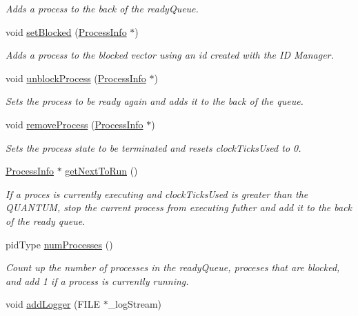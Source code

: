 \begin{DoxyCompactItemize}
\begin{DoxyCompactList}\small\item\em \-Adds a process to the back of the ready\-Queue. \end{DoxyCompactList}\item 
void \hyperlink{classcRoundRobin_a13609de0f36c81a780072f9c0730f963}{set\-Blocked} (\hyperlink{structProcessInfo}{\-Process\-Info} $\ast$)
\begin{DoxyCompactList}\small\item\em \-Adds a process to the blocked vector using an id created with the \-I\-D \-Manager. \end{DoxyCompactList}\item 
void \hyperlink{classcRoundRobin_a278d541c78f034020f6921b22a7d37af}{unblock\-Process} (\hyperlink{structProcessInfo}{\-Process\-Info} $\ast$)
\begin{DoxyCompactList}\small\item\em \-Sets the process to be ready again and adds it to the back of the queue. \end{DoxyCompactList}\item 
void \hyperlink{classcRoundRobin_a1bc7bfc4c36bdbe3f3938810817d885e}{remove\-Process} (\hyperlink{structProcessInfo}{\-Process\-Info} $\ast$)
\begin{DoxyCompactList}\small\item\em \-Sets the process state to be terminated and resets clock\-Ticks\-Used to 0. \end{DoxyCompactList}\item 
\hyperlink{structProcessInfo}{\-Process\-Info} $\ast$ \hyperlink{classcRoundRobin_a1979ff71bb2320bdb00eae5feb2b2688}{get\-Next\-To\-Run} ()
\begin{DoxyCompactList}\small\item\em \-If a proces is currently executing and clock\-Ticks\-Used is greater than the \-Q\-U\-A\-N\-T\-U\-M, stop the current process from executing futher and add it to the back of the ready queue. \end{DoxyCompactList}\item 
\hypertarget{classcRoundRobin_afa0cdfcfc0b8222d39ad5e9c23db1f25}{pid\-Type \hyperlink{classcRoundRobin_afa0cdfcfc0b8222d39ad5e9c23db1f25}{num\-Processes} ()}\label{dc/dcc/classcRoundRobin_afa0cdfcfc0b8222d39ad5e9c23db1f25}

\begin{DoxyCompactList}\small\item\em \-Count up the number of processes in the ready\-Queue, proceses that are blocked, and add 1 if a process is currently running. \end{DoxyCompactList}\item 
\hypertarget{classcRoundRobin_a6e0d0ec272a4f7ffe03166b1ff08276b}{void \hyperlink{classcRoundRobin_a6e0d0ec272a4f7ffe03166b1ff08276b}{add\-Logger} (\-F\-I\-L\-E $\ast$\-\_\-log\-Stream)}\label{dc/dcc/classcRoundRobin_a6e0d0ec272a4f7ffe03166b1ff08276b}


\end{DoxyCompactItemize}

